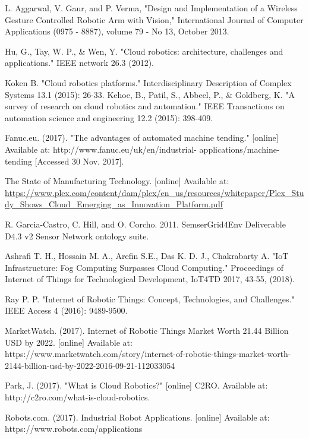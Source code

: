 \documentclass[conference]{IEEEtran}
\begin{document}
\begin{thebibliography}{1}

L. Aggarwal, V. Gaur, and P. Verma, "Design and Implementation of a Wireless Gesture Controlled Robotic Arm with Vision," International Journal of Computer Applications (0975 - 8887), volume 79 - No 13, October 2013.

Hu, G., Tay, W. P., \& Wen, Y. "Cloud robotics: architecture, challenges and applications." IEEE network 26.3 (2012).


Koken B. "Cloud robotics platforms." Interdisciplinary Description of Complex Systems 13.1 (2015): 26-33. 
Kehoe, B., Patil, S., Abbeel, P., \& Goldberg, K. "A survey of research on cloud robotics and automation." IEEE Transactions on automation science and engineering 12.2 (2015): 398-409.

Fanuc.eu. (2017). "The advantages of automated machine tending." [online] Available at: http://www.fanuc.eu/uk/en/industrial- applications/machine-tending [Accessed 30 Nov. 2017].

The State of Manufacturing Technology. [online] Available at: 
\url{https://www.plex.com/content/dam/plex/en_us/resources/whitepaper/Plex_Study_Shows_Cloud_Emerging_as_Innovation_Platform.pdf}

R. Garcia-Castro, C. Hill, and O. Corcho. 2011. SemserGrid4Env Deliverable D4.3 v2 Sensor Network ontology suite.

Ashrafi T. H., Hossain M. A., Arefin S.E., Das K. D. J., Chakrabarty A. "IoT Infrastructure: Fog Computing Surpasses Cloud Computing." Proceedings of Internet of Things for Technological Development, IoT4TD 2017, 43-55, (2018).

Ray P. P. "Internet of Robotic Things: Concept, Technologies, and Challenges." IEEE Access 4 (2016): 9489-9500.

MarketWatch. (2017). Internet of Robotic Things Market Worth 21.44 Billion USD by 2022. [online] Available at: https://www.marketwatch.com/story/internet-of-robotic-things-market-worth-2144-billion-usd-by-2022-2016-09-21-112033054

Park, J. (2017). "What is Cloud Robotics?" [online] C2RO. Available at: http://c2ro.com/what-is-cloud-robotics.

Robots.com. (2017). Industrial Robot Applications. [online] Available at: https://www.robots.com/applications


\end{thebibliography}
\end{document}
